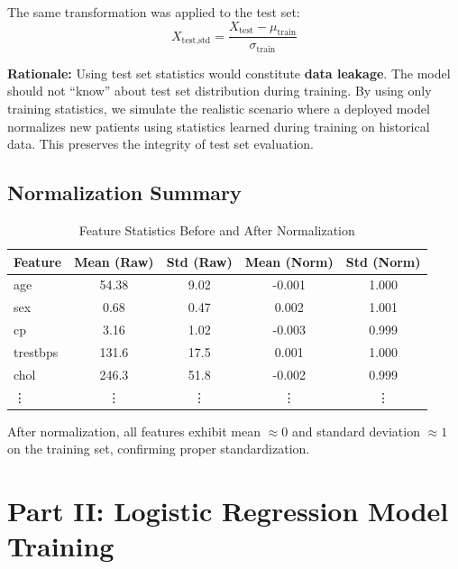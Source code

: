 \documentclass[11pt]{article}
\begin{document}
The same transformation was applied to the test set:
\begin{equation}
    X_{\text{test,std}} = \frac{X_{\text{test}} - \mu_{\text{train}}}{\sigma_{\text{train}}}
\end{equation}

\textbf{Rationale:} Using test set statistics would constitute \textbf{data leakage}. The model should not ``know'' about test set distribution during training. By using only training statistics, we simulate the realistic scenario where a deployed model normalizes new patients using statistics learned during training on historical data. This preserves the integrity of test set evaluation.

\subsection{Normalization Summary}

\begin{table}[H]
    \centering
    \caption{Feature Statistics Before and After Normalization}
    \begin{tabular}{lcccc}
        \toprule
        \textbf{Feature} & \textbf{Mean (Raw)} & \textbf{Std (Raw)} & \textbf{Mean (Norm)} & \textbf{Std (Norm)} \\
        \midrule
        age       & 54.38 & 9.02  & -0.001 & 1.000 \\
        sex       & 0.68  & 0.47  &  0.002 & 1.001 \\
        cp        & 3.16  & 1.02  & -0.003 & 0.999 \\
        trestbps  & 131.6 & 17.5  &  0.001 & 1.000 \\
        chol      & 246.3 & 51.8  & -0.002 & 0.999 \\
        \vdots    & \vdots & \vdots & \vdots & \vdots \\
        \bottomrule
    \end{tabular}
    \label{tab:normalization}
\end{table}

After normalization, all features exhibit mean $\approx 0$ and standard deviation $\approx 1$ on the training set, confirming proper standardization.

\newpage

\section{Part II: Logistic Regression Model Training}
\end{document}
